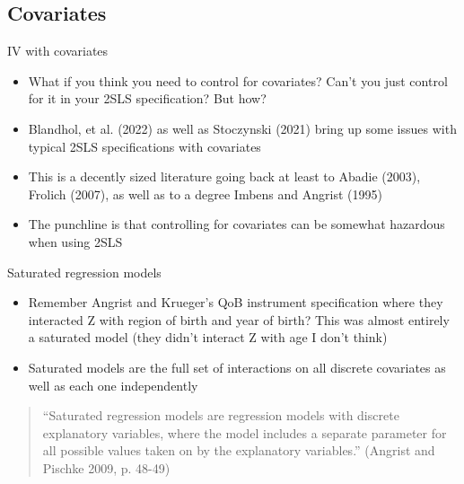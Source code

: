 \documentclass{beamer}
\begin{document}
\subsection{Covariates}

\begin{frame}{IV with covariates}

\begin{itemize}
\item What if you think you need to control for covariates?  Can't you just control for it in your 2SLS specification? But how?
\item Blandhol, et al. (2022) as well as Stoczynski (2021) bring up some issues with typical 2SLS specifications with covariates
\item This is a decently sized literature going back at least to Abadie (2003), Frolich (2007), as well as to a degree Imbens and Angrist (1995)
\item The punchline is that controlling for covariates can be somewhat hazardous when using 2SLS
\end{itemize}


\end{frame}


\begin{frame}{Saturated regression models}

\begin{itemize}
\item Remember Angrist and Krueger's QoB instrument specification where they interacted Z with region of birth and year of birth?  This was almost entirely a saturated model (they didn't interact Z with age I don't think)
\item Saturated models are the full set of interactions on all discrete covariates as well as each one independently 
\end{itemize}

\bigskip

\begin{quote}
``Saturated regression models are regression models with discrete explanatory variables, where the model includes a separate parameter for all possible values taken on by the explanatory variables.'' (Angrist and Pischke 2009, p. 48-49)
\end{quote}

\end{frame}
\end{document}
